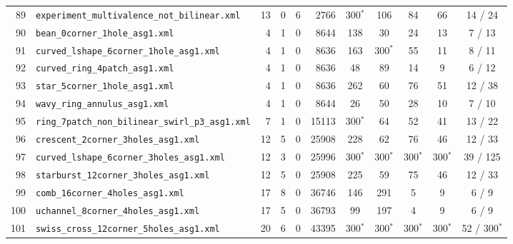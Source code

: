 \documentclass[10pt,a4paper]{article}
\begin{document}
{\begin{longtable}{@{}rlrrrrccccc@{}}
89 & \texttt{experiment\_multivalence\_not\_bilinear.xml} & 13 & 0 & 6 & 2766 & 300$^*$ & 106 & 84 & 66 & 14 / 24 \\
90 & \texttt{bean\_0corner\_1hole\_asg1.xml} & 4 & 1 & 0 & 8644 & 138 & 30 & 24 & 13 & 7 / 13 \\
91 & \texttt{curved\_lshape\_6corner\_1hole\_asg1.xml} & 4 & 1 & 0 & 8636 & 163 & 300$^*$ & 55 & 11 & 8 / 11 \\
92 & \texttt{curved\_ring\_4patch\_asg1.xml} & 4 & 1 & 0 & 8636 & 48 & 89 & 14 & 9 & 6 / 12 \\
93 & \texttt{star\_5corner\_1hole\_asg1.xml} & 4 & 1 & 0 & 8636 & 262 & 60 & 76 & 51 & 12 / 38 \\
94 & \texttt{wavy\_ring\_annulus\_asg1.xml} & 4 & 1 & 0 & 8644 & 26 & 50 & 28 & 10 & 7 / 10 \\
95 & \texttt{ring\_7patch\_non\_bilinear\_swirl\_p3\_asg1.xml} & 7 & 1 & 0 & 15113 & 300$^*$ & 64 & 52 & 41 & 13 / 22 \\
96 & \texttt{crescent\_2corner\_3holes\_asg1.xml} & 12 & 5 & 0 & 25908 & 228 & 62 & 76 & 46 & 12 / 33 \\
97 & \texttt{curved\_lshape\_6corner\_3holes\_asg1.xml} & 12 & 3 & 0 & 25996 & 300$^*$ & 300$^*$ & 300$^*$ & 300$^*$ & 39 / 125 \\
98 & \texttt{starburst\_12corner\_3holes\_asg1.xml} & 12 & 5 & 0 & 25908 & 225 & 59 & 75 & 46 & 12 / 33 \\
99 & \texttt{comb\_16corner\_4holes\_asg1.xml} & 17 & 8 & 0 & 36746 & 146 & 291 & 5 & 9 & 6 / 9 \\
100 & \texttt{uchannel\_8corner\_4holes\_asg1.xml} & 17 & 5 & 0 & 36793 & 99 & 197 & 4 & 9 & 6 / 9 \\
101 & \texttt{swiss\_cross\_12corner\_5holes\_asg1.xml} & 20 & 6 & 0 & 43395 & 300$^*$ & 300$^*$ & 300$^*$ & 300$^*$ & 52 / 300$^*$ \\
\bottomrule
\end{longtable}
}
\end{document}
